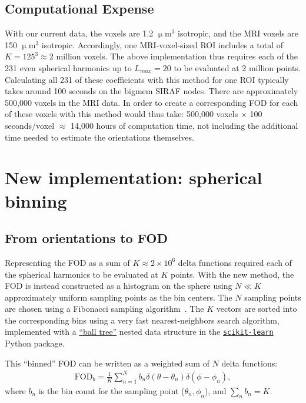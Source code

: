 \documentclass{article}
\begin{document}
\subsection{Computational Expense}
With our current data, the \uct voxels are 1.2 $\upmu$m$^3$ isotropic, and the
MRI voxels are 150 $\upmu$m$^3$ isotropic. Accordingly, one MRI-voxel-sized ROI
includes a total of $K=125^3\approx 2$ million \uct voxels. The above
implementation thus requires each of the 231 even spherical harmonics up to
$L_{max}=20$ to be evaluated at 2 million points. Calculating all 231 of these
coefficients with this method for one ROI typically takes around 100 seconds on
the bigmem SIRAF nodes. There are approximately 500,000 voxels in the MRI data.
In order to create a corresponding \uct FOD for each of these voxels with this
method would thus take: 500,000 voxels $\times$ 100 seconds/voxel $\approx$
14,000 hours of computation time, not including the additional time needed
to estimate the orientations themselves.

\section{New implementation: spherical binning}
\subsection{From orientations to FOD}
Representing the FOD as a sum of $K\approx 2 \times 10^6$ delta functions
required each of the spherical harmonics to be evaluated at $K$ points. With the
new method, the FOD is instead constructed as a histogram on the sphere using
$N \ll K$ approximately uniform sampling points as the bin centers. The $N$
sampling points are chosen using a Fibonacci sampling
algorithm~\cite{Hannay2004}. The $K$ vectors are sorted into the corresponding
bins using a very fast nearest-neighbors search algorithm, implemented with a
\href{https://en.wikipedia.org/wiki/Ball_tree}{``ball tree''} nested data
structure in the
\href{http://scikit-learn.org/stable/modules/generated/sklearn.neighbors.NearestNeighbors.html#sklearn.neighbors.NearestNeighbors}{\texttt{scikit-learn}}
Python package.

This ``binned'' FOD can be written as a weighted sum of $N$ delta functions:
\begin{align}
  \label{eq:3}
  \text{FOD}_b = \frac{1}{K}\sum_{n=1}^N b_n \delta(\theta - \theta_n)\delta(\phi - \phi_n),
\end{align}
where $b_n$ is the bin count for the sampling point ($\theta_n, \phi_n$), and
$\sum_n b_n = K$.
\end{document}
